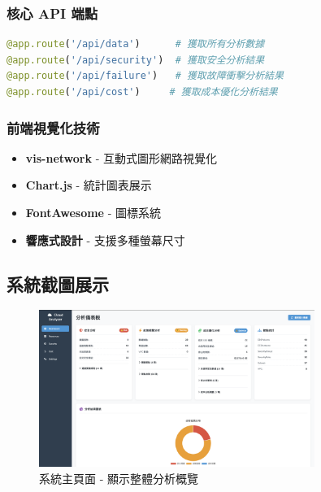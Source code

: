 \documentclass[11pt,a4paper]{ctexart}
\begin{document}
\subsubsection{核心 API 端點}

\begin{lstlisting}[language=Python,caption={儀表板 API 端點}]
@app.route('/api/data')      # 獲取所有分析數據
@app.route('/api/security')  # 獲取安全分析結果
@app.route('/api/failure')   # 獲取故障衝擊分析結果
@app.route('/api/cost')     # 獲取成本優化分析結果
\end{lstlisting}

\subsubsection{前端視覺化技術}

\begin{itemize}[leftmargin=1.5em]
\item \textbf{vis-network} - 互動式圖形網路視覺化
\item \textbf{Chart.js} - 統計圖表展示
\item \textbf{FontAwesome} - 圖標系統
\item \textbf{響應式設計} - 支援多種螢幕尺寸
\end{itemize}

\subsection{系統截圖展示}

\begin{figure}[H]
\centering
\includegraphics[width=0.8\textwidth]{Mainpage_Screenshot.png}
\caption{系統主頁面 - 顯示整體分析概覽}
\label{fig:mainpage}
\end{figure}
\end{document}
